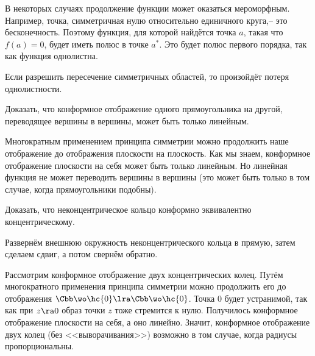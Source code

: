\documentclass[a4paper]{article}
\begin{document}
\begin{note}
В некоторых случаях продолжение функции может оказаться мероморфным. Например, точка, симметричная нулю относительно
единичного круга,-- это бесконечность. Поэтому функция,  для которой найдётся точка $a$, такая что $f(a)=0$, будет
иметь полюс в точке $a^*$. Это будет полюс первого порядка, так как функция однолистна.
\end{note}

\begin{note}
Если разрешить пересечение симметричных областей, то произойдёт потеря однолистности.
\end{note}

\begin{problem}
Доказать, что конформное отображение одного прямоугольника на другой, переводящее вершины в вершины,
может быть только линейным.
\end{problem}
\begin{solution}
Многократным применением принципа симметрии можно продолжить наше отображение до отображения плоскости на плоскость.
Как мы знаем, конформное отображение плоскости на себя может быть только линейным.
Но линейная функция не может переводить вершины в вершины (это может быть только в том случае, когда прямоугольники
подобны).
\end{solution}

\begin{problem}
Доказать, что неконцентрическое кольцо конформно эквивалентно концентрическому.
\end{problem}
\begin{solution}
Развернём внешнюю окружность неконцентрического кольца в прямую, затем сделаем сдвиг, а потом свернём обратно.
\end{solution}

\begin{ex}
Рассмотрим конформное отображение двух концентрических колец. Путём многократного применения принципа симметрии
можно продолжить его до отображения $\Cbb\wo\hc{0} \lra \Cbb \wo\hc{0}$. Точка $0$ будет устранимой,
так как при $z\ra0$ образ точки $z$ тоже стремится к нулю. Получилось конформное отображение плоскости на себя,
а оно линейно. Значит, конформное отображение двух колец (без <<выворачивания>>) возможно в том случае, когда
радиусы пропорциональны.
\end{ex}

\end{document}

